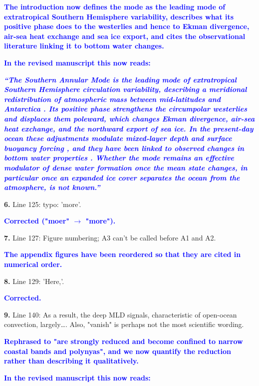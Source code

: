\documentclass[pdflatex,sn-nature]{sn-jnl}
\begin{document}
\noindent\textcolor{blue}{\textbf{The introduction now defines the mode as the leading mode of extratropical Southern Hemisphere variability, describes what its positive phase does to the westerlies and hence to Ekman divergence, air-sea heat exchange and sea ice export, and cites the observational literature linking it to bottom water changes.}}


\noindent\textcolor{blue}{\textbf{In the revised manuscript this now reads:}}


\medskip
\noindent\textcolor{blue}{\textbf{\textit{``The Southern Annular Mode is the leading mode of extratropical Southern Hemisphere circulation variability, describing a meridional redistribution of atmospheric mass between mid-latitudes and Antarctica . Its positive phase strengthens the circumpolar westerlies and displaces them poleward, which changes Ekman divergence, air-sea heat exchange, and the northward export of sea ice. In the present-day ocean these adjustments modulate mixed-layer depth and surface buoyancy forcing , and they have been linked to observed changes in bottom water properties . Whether the mode remains an effective modulator of dense water formation once the mean state changes, in particular once an expanded ice cover separates the ocean from the atmosphere, is not known.''}}}
\medskip

\medskip
\noindent \textbf{6.} Line 125: typo: 'more'.
\medskip

\noindent\textcolor{blue}{\textbf{Corrected ("moer" $\to$ "more").}}


\medskip
\noindent \textbf{7.} Line 127: Figure numbering; A3 can't be called before A1 and A2.
\medskip

\noindent\textcolor{blue}{\textbf{The appendix figures have been reordered so that they are cited in numerical order.}}


\medskip
\noindent \textbf{8.} Line 129: 'Here,'.
\medskip

\noindent\textcolor{blue}{\textbf{Corrected.}}


\medskip
\noindent \textbf{9.} Line 140: As a result, the deep MLD signals, characteristic of open-ocean convection, largely\ldots{}. Also, "vanish" is perhaps not the most scientific wording.
\medskip

\noindent\textcolor{blue}{\textbf{Rephrased to "are strongly reduced and become confined to narrow coastal bands and polynyas", and we now quantify the reduction rather than describing it qualitatively.}}


\noindent\textcolor{blue}{\textbf{In the revised manuscript this now reads:}}
\end{document}
